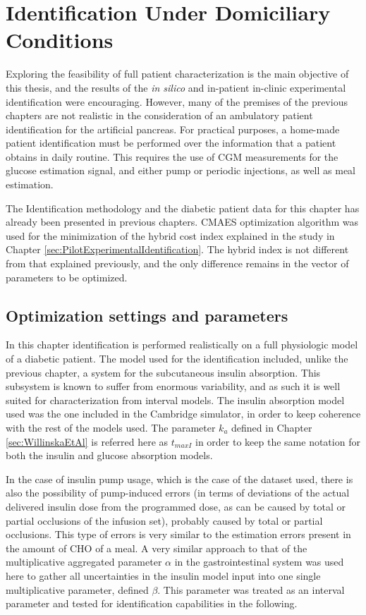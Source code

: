 
\chapter{Identification Under Domiciliary Conditions}
\label{sec:ExperimentalIntervalIdentification}

Exploring the feasibility of full patient characterization is the main objective of this thesis, and the results of the \textit{in silico} and in-patient in-clinic experimental identification were encouraging. However, many of the premises of the previous chapters are not realistic in the consideration of an ambulatory patient identification for the artificial pancreas. For practical purposes, a home-made patient identification must be performed over the information that a patient obtains in daily routine. This requires the use of CGM measurements for the glucose estimation signal, and either pump or periodic injections, as well as meal estimation.

The Identification methodology and the diabetic patient data for this chapter has already been presented in previous chapters. CMAES optimization algorithm was used for the minimization of the hybrid cost index explained in the study in Chapter \ref{sec:PilotExperimentalIdentification}. The hybrid index is not different from that explained previously, and the only difference remains in the vector of parameters to be optimized.

\section{Optimization settings and parameters}
\label{sec:OptimizationSettingsAndParameters}

In this chapter identification is performed realistically on a full physiologic model of a diabetic patient. The model used for the identification included, unlike the previous chapter, a system for the subcutaneous insulin absorption. This subsystem is known to suffer from enormous variability, and as such it is well suited for characterization from interval models. The insulin absorption model used was the one included in the Cambridge simulator, in order to keep coherence with the rest of the models used. The parameter $k_a$ defined in Chapter \ref{sec:WillinskaEtAl} is referred here as $t_{maxI}$ in order to keep the same notation for both the insulin and glucose absorption models.

In the case of insulin pump usage, which is the case of the dataset used, there is also the possibility of pump-induced errors (in terms of deviations of the actual delivered insulin dose from the programmed dose, as can be caused by total or partial occlusions of the infusion set), probably caused by total or partial occlusions. This type of errors is very similar to the estimation errors present in the amount of CHO of a meal. A very similar approach to that of the multiplicative aggregated parameter $\alpha$ in the gastrointestinal system was used here to gather all uncertainties in the insulin model input into one single multiplicative parameter, defined $\beta$. This parameter was treated as an interval parameter and tested for identification capabilities in the following.

